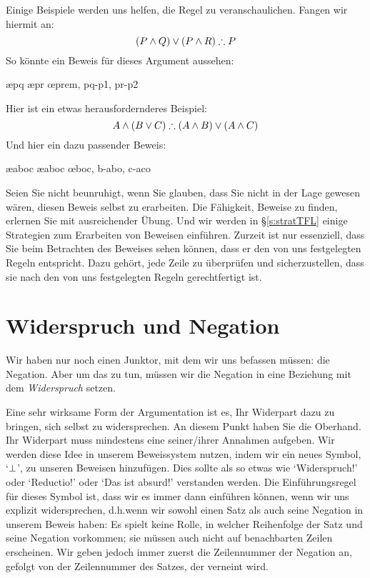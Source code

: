 Einige Beispiele werden uns helfen, die Regel zu veranschaulichen. Fangen wir hiermit an:
$$(P \eand Q) \eor (P \eand R) \therefore P$$
So könnte ein Beweis für dieses Argument aussehen:
	\begin{fitchproof}
			\open
				\ae{pq}
			\close
			\open
				\ae{pr}
			\close
		\oe{prem, pq-p1, pr-p2}
	\end{fitchproof}
Hier ist ein etwas herausfordernderes Beispiel:
	$$ A \eand (B \eor C) \therefore (A \eand B) \eor (A \eand C)$$
Und hier ein dazu passender Beweis:
	\begin{fitchproof}
		\hypo{aboc}{A \eand (B \eor C)}
		\ae{aboc}
		\ae{aboc}
		\open
			\hypo{b}{B}
			\ai{a,b}
			\have{abo}{(A \eand B) \eor (A \eand C)}\oi{ab}
		\close
		\open
			\hypo{c}{C}
			\ai{a,c}
			\have{aco}{(A \eand B) \eor (A \eand C)}\oi{ac}
		\close
	\oe{boc, b-abo, c-aco}
	\end{fitchproof}
Seien Sie nicht beunruhigt, wenn Sie glauben, dass Sie nicht in der Lage gewesen wären, diesen Beweis selbst zu erarbeiten. Die Fähigkeit, Beweise zu finden, erlernen Sie mit ausreichender Übung. Und wir werden in \S\ref{s:stratTFL} einige Strategien zum Erarbeiten von Beweisen einführen. Zurzeit ist nur essenziell, dass Sie beim Betrachten des Beweises sehen können, dass er den von uns festgelegten Regeln entspricht. Dazu gehört, jede Zeile zu überprüfen und sicherzustellen, dass sie nach den von uns festgelegten Regeln gerechtfertigt ist.

\section{Widerspruch und Negation}

Wir haben nur noch einen Junktor, mit dem wir uns befassen müssen: die Negation. Aber um das zu tun, müssen wir die Negation in eine Beziehung mit dem \emph{Widerspruch} setzen. 

Eine sehr wirksame Form der Argumentation ist es, Ihr Widerpart dazu zu bringen, sich selbst zu widersprechen. An diesem Punkt haben Sie die Oberhand. Ihr Widerpart muss mindestens eine seiner/ihrer Annahmen aufgeben. Wir werden diese Idee in unserem Beweissystem nutzen, indem wir ein neues Symbol, `$\bot$', zu unseren Beweisen hinzufügen. Dies sollte als so etwas wie `Widerspruch!' oder `Reductio!' oder `Das ist absurd!' verstanden werden. Die Einführungsregel für dieses Symbol ist, dass wir es immer dann einführen können, wenn wir uns explizit widersprechen, d.h.\@ wenn wir sowohl einen Satz als auch seine Negation in unserem Beweis haben: 
Es spielt keine Rolle, in welcher Reihenfolge der Satz und seine Negation vorkommen; sie müssen auch nicht auf benachbarten Zeilen erscheinen. Wir geben jedoch immer zuerst die Zeilennummer der Negation an, gefolgt von der Zeilennummer des Satzes, der verneint wird.


